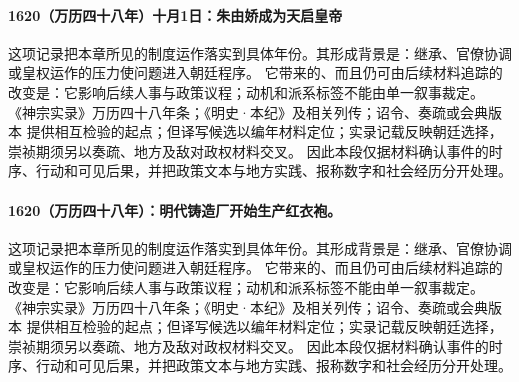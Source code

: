 \paragraph{1620（万历四十八年）十月1日：朱由娇成为天启皇帝} 这项记录把本章所见的制度运作落实到具体年份。其形成背景是：继承、官僚协调或皇权运作的压力使问题进入朝廷程序。 它带来的、而且仍可由后续材料追踪的改变是：它影响后续人事与政策议程；动机和派系标签不能由单一叙事裁定。 《神宗实录》万历四十八年条；《明史·本纪》及相关列传；诏令、奏疏或会典版本 提供相互检验的起点；但译写候选以编年材料定位；实录记载反映朝廷选择，崇祯期须另以奏疏、地方及敌对政权材料交叉。 因此本段仅据材料确认事件的时序、行动和可见后果，并把政策文本与地方实践、报称数字和社会经历分开处理。

\paragraph{1620（万历四十八年）：明代铸造厂开始生产红衣袍。} 这项记录把本章所见的制度运作落实到具体年份。其形成背景是：继承、官僚协调或皇权运作的压力使问题进入朝廷程序。 它带来的、而且仍可由后续材料追踪的改变是：它影响后续人事与政策议程；动机和派系标签不能由单一叙事裁定。 《神宗实录》万历四十八年条；《明史·本纪》及相关列传；诏令、奏疏或会典版本 提供相互检验的起点；但译写候选以编年材料定位；实录记载反映朝廷选择，崇祯期须另以奏疏、地方及敌对政权材料交叉。 因此本段仅据材料确认事件的时序、行动和可见后果，并把政策文本与地方实践、报称数字和社会经历分开处理。
